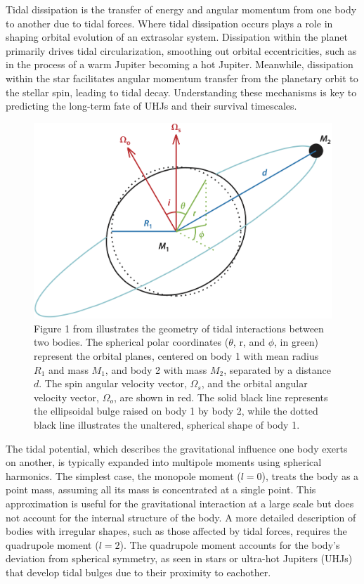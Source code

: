 \documentclass[oneside,12pt]{amsart}
\numberwithin{page}{section}
\begin{document}
Tidal dissipation is the transfer of energy and angular momentum from one body to another due to tidal forces. Where tidal dissipation occurs plays a role in shaping orbital evolution of an extrasolar system. Dissipation within the planet primarily drives tidal circularization, smoothing out orbital eccentricities, such as in the process of a warm Jupiter becoming a hot Jupiter. Meanwhile, dissipation within the star facilitates angular momentum transfer from the planetary orbit to the stellar spin, leading to tidal decay. Understanding these mechanisms is key to predicting the long-term fate of UHJs and their survival timescales.

\begin{figure}[htbp]
    \centering
    \includegraphics[width=0.7\linewidth]{figs/ogilvie_fig1.png}
    \caption{Figure 1 from \citet{ogilvie2014tidal} illustrates the geometry of tidal interactions between two bodies. The spherical polar coordinates ($\theta$, r, and $\phi$, in green) represent the orbital planes, centered on body 1 with mean radius $R_1$ and mass $M_1$, and body 2 with mass $M_2$, separated by a distance $d$. The spin angular velocity vector, $\Omega_s$, and the orbital angular velocity vector, $\Omega_o$, are shown in red. The solid black line represents the ellipsoidal bulge raised on body 1 by body 2, while the dotted black line illustrates the unaltered, spherical shape of body 1.}
    \label{fig:ogilvie-fig1}
\end{figure}

The tidal potential, which describes the gravitational influence one body exerts on another, is typically expanded into multipole moments using spherical harmonics. The simplest case, the monopole moment ($l = 0$), treats the body as a point mass, assuming all its mass is concentrated at a single point. This approximation is useful for the gravitational interaction at a large scale but does not account for the internal structure of the body. A more detailed description of bodies with irregular shapes, such as those affected by tidal forces, requires the quadrupole moment ($l = 2$). The quadrupole moment accounts for the body's deviation from spherical symmetry, as seen in stars or ultra-hot Jupiters (UHJs) that develop tidal bulges due to their proximity to eachother.
\end{document}
